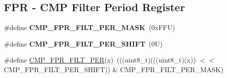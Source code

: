 \subsection*{F\+PR -\/ C\+MP Filter Period Register}
\begin{DoxyCompactItemize}
\item 
\mbox{\label{group___c_m_p___register___masks_gaf8ca758656c156ecadfbb6f9e57a3eef}} 
\#define {\bfseries C\+M\+P\+\_\+\+F\+P\+R\+\_\+\+F\+I\+L\+T\+\_\+\+P\+E\+R\+\_\+\+M\+A\+SK}~(0x\+F\+F\+U)
\item 
\mbox{\label{group___c_m_p___register___masks_gaa563be7a82c0c1e3802e7ac7c920bf3a}} 
\#define {\bfseries C\+M\+P\+\_\+\+F\+P\+R\+\_\+\+F\+I\+L\+T\+\_\+\+P\+E\+R\+\_\+\+S\+H\+I\+FT}~(0\+U)
\item 
\#define \mbox{\hyperlink{group___c_m_p___register___masks_ga006ee9cac0b4b9daa94e3b1d6a440627}{C\+M\+P\+\_\+\+F\+P\+R\+\_\+\+F\+I\+L\+T\+\_\+\+P\+ER}}(x)~(((uint8\+\_\+t)(((uint8\+\_\+t)(x)) $<$$<$ C\+M\+P\+\_\+\+F\+P\+R\+\_\+\+F\+I\+L\+T\+\_\+\+P\+E\+R\+\_\+\+S\+H\+I\+FT)) \& C\+M\+P\+\_\+\+F\+P\+R\+\_\+\+F\+I\+L\+T\+\_\+\+P\+E\+R\+\_\+\+M\+A\+SK)
\end{DoxyCompactItemize}
